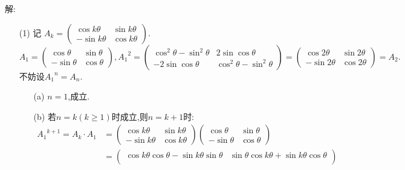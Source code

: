 \documentclass{article}
\begin{document}
\begin{enumerate}
        解:
        \begin{enumerate}
            \item [(1)]记
            $A_k=\begin{pmatrix}
                \cos k\theta&\sin k\theta\\
                -\sin k\theta&\cos k\theta
            \end{pmatrix}$.
            \[
                A_1=
                \begin{pmatrix}
                    \cos\theta &  \sin\theta\\
                    -\sin\theta  & \cos\theta
                 \end{pmatrix},
                {A_1}^2=
                \begin{pmatrix}
                    {\cos}^{2}\theta-{\sin}^{2}\theta &  2\sin\cos\theta\\
                    -2\sin\cos\theta  & {\cos}^{2}\theta-{\sin}^{2}\theta
                 \end{pmatrix}
                 =
                 \begin{pmatrix}
                    \cos 2\theta &  \sin 2\theta\\
                    -\sin 2\theta  & \cos 2\theta
                 \end{pmatrix}
                 =A_2.
            \]
            不妨设${A_1}^{n}=A_n$.
            \begin{enumerate}
                \item [(a)]$n=1$,成立.
                \item [(b)]若$n=k(k\geqslant 1)$时成立,则$n=k+1$时:
                \begin{align*}
                    {A_1}^{k+1}
                    =A_k\cdot A_1
                    &=
                    \begin{pmatrix}
                        \cos k\theta&\sin k\theta\\
                        -\sin k\theta&\cos k\theta
                    \end{pmatrix}
                    \begin{pmatrix}
                        \cos \theta&\sin \theta\\
                        -\sin \theta&\cos \theta
                    \end{pmatrix}\\
                    &=
                    \begin{pmatrix}
                        \cos k\theta\cos\theta-\sin k\theta\sin\theta & \sin\theta\cos k\theta+\sin k\theta\cos\theta\\

\end{pmatrix}
\end{align*}
\end{enumerate}
\end{enumerate}
\end{enumerate}
\end{document}
